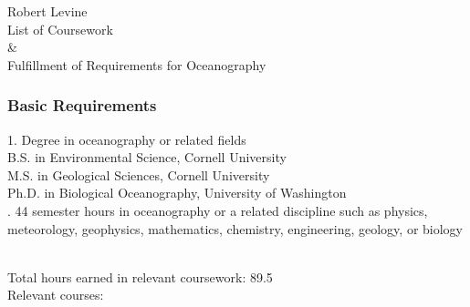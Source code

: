 \documentclass[12pt,a4paper]{article}
\begin{document}
\begin{center}
{\Large Robert Levine} 
\medskip\\
List of Coursework\\ \& \\ Fulfillment of Requirements for Oceanography
\end{center}
\subsubsection*{Basic Requirements}

1. Degree in oceanography or related fields
\medskip\\ B.S. in Environmental Science, Cornell University\\
M.S. in Geological Sciences, Cornell University\\
Ph.D. in Biological Oceanography, University of Washington\\

. 44 semester hours in oceanography or a related discipline such as physics, meteorology, geophysics, mathematics, chemistry, engineering, geology, or biology

\medskip\\\noindent Total hours earned in relevant coursework: 89.5\\
Relevant courses:\\

\end{document}
